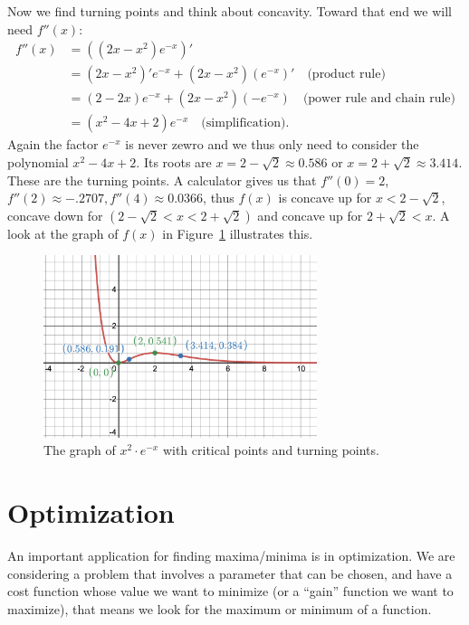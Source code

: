 \begin{bsp}
Now we find turning points and think about concavity. Toward that end we will
need $f''(x)$: \begin{equation*} \begin{split} f''(x) &= ((2x-x^2)e^{-x})' \\
&= (2x-x^2)'e^{-x} + (2x-x^2)(e^{-x})' \quad \text{(product rule)} \\ &=
(2-2x)e^{-x} + (2x-x^2)(-e^{-x}) \quad \text{(power rule and chain rule)}\\
&= (x^2-4x+2)e^{-x} \quad \text{(simplification)}.  \end{split}
\end{equation*}
Again the factor $e^{-x}$ is never zewro and we thus only need to consider
the polynomial $x^2-4x+2$. Its roots are
$x=2-\sqrt{2} \approx 0.586$ or $x=2+\sqrt{2} \approx 3.414$. These
are the turning points. A calculator gives us  that
$f''(0) = 2$, $f''(2) \approx -.2707, f''(4) \approx 0.0366$, thus
$f(x)$ is concave up for $x<2-\sqrt{2}$, concave down for
$(2-\sqrt{2}<x<2+\sqrt{2})$ and concave up for $2+\sqrt{2}<x$.
A look at the graph of $f(x)$ in Figure~\ref{tnex3fig} illustrates this.
\begin{figure}
\begin{center}
\includegraphics[width=8cm]{pic/tnex3pic.png}
\end{center}
\caption{The graph of $x^2\cdot e^{-x}$ with critical points and turning
points.}
\label{tnex3fig}
\end{figure}
\end{bsp}


\section{Optimization}

An important application for finding maxima/minima is in optimization. We
are considering a problem that involves a parameter that can be chosen, and
have a cost function whose value we want to minimize (or a ``gain'' function
we want to maximize), that means we look for the maximum or minimum of a
function.
\smallskip

